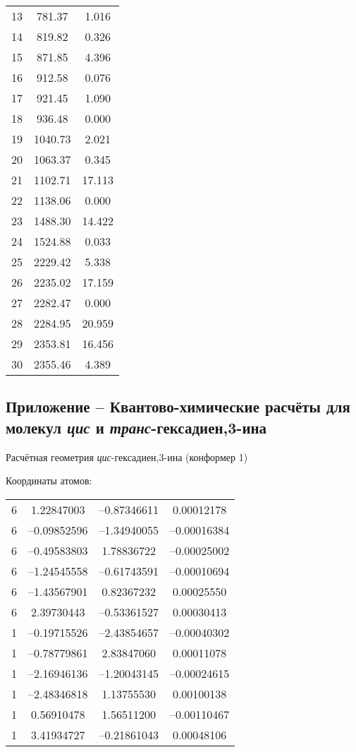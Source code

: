 {\begin{center}
\begin{tabular}{ccc}
    13 &  781.37 &   1.016 \\
    14 &  819.82 &   0.326 \\
    15 &  871.85 &    4.396 \\
    16 &  912.58 &   0.076 \\
    17 &  921.45 &    1.090 \\
    18 &  936.48 &   0.000 \\
    19 & 1040.73 &  2.021 \\
    20 & 1063.37 &   0.345 \\
    21 & 1102.71 &   17.113 \\
    22 & 1138.06 &    0.000 \\
    23 & 1488.30 &   14.422 \\
    24 & 1524.88 &    0.033 \\
    25 & 2229.42 &    5.338 \\
    26 & 2235.02 &  17.159 \\
    27 & 2282.47 &    0.000 \\
    28 & 2284.95 &   20.959 \\
    29 & 2353.81 &   16.456 \\
    30 & 2355.46 &    4.389 \\
  \end{tabular}
\end{center}
\subsection*{Приложение   -- Квантово-химические расчёты для молекул {\itshape цис} и {\itshape транс}-гексадиен,3\nobreakdash-ина}
Расчётная геометрия {\itshape цис}-гексадиен,3\nobreakdash-ина (конформер 1)

Координаты атомов:
\begin{center}
\begin{tabular}{cccc}
   6  &   1.22847003 & --0.87346611 &  0.00012178\\
   6  &  --0.09852596 & --1.34940055 & --0.00016384\\
   6  &  --0.49583803 &  1.78836722 & --0.00025002\\
   6  &  --1.24545558 & --0.61743591 & --0.00010694\\
   6  &  --1.43567901 &  0.82367232 &  0.00025550\\
   6   &  2.39730443 & --0.53361527 &  0.00030413\\
   1  &  --0.19715526 & --2.43854657 & --0.00040302\\
   1  &  --0.78779861 &  2.83847060 &  0.00011078\\
   1  &  --2.16946136 & --1.20043145 & --0.00024615\\
   1  &  --2.48346818 &  1.13755530 &  0.00100138\\
   1  &   0.56910478 &  1.56511200 & --0.00110467\\
   1  &   3.41934727 & --0.21861043 &  0.00048106\\
  \end{tabular}
\end{center}

}
